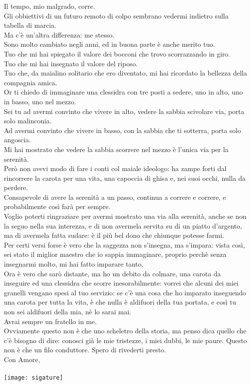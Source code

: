 \documentclass[17pt]{extletter}
\begin{document}
Il tempo, mio malgrado, corre.\\
Gli obbiettivi di un futuro remoto di colpo sembrano vedermi indietro sulla tabella di marcia.\\
Ma c'è un'altra differenza: me stesso.\\
Sono molto cambiato negli anni, ed in buona parte è anche merito tuo.\\
Tuo che mi hai spiegato il valore dei bocconi che trovo scorrazzando in giro.\\
Tuo che mi hai insegnato il valore del riposo.\\
Tuo che, da maialino solitario che ero diventato, mi hai ricordato la bellezza della compagnia amica.\\
Or ti chiedo di immaginare una clessidra con tre posti a sedere, uno in alto, uno in basso, uno nel mezzo.\\
Sei tu ad avermi convinto che vivere in alto, vedere la sabbia scivolare via, porta solo malinconia.\\
Ad avermi convinto che vivere in basso, con la sabbia che ti sotterra, porta solo angoscia.\\
Mi hai mostrato che vedere la sabbia scorrere nel mezzo è l'unica via per la serenità.\\
Però non avevi modo di fare i conti col maiale ideologo: ha zampe forti dal rincorrere la carota per una vita, una capoccia di ghisa e, nei suoi occhi, nulla da perdere.\\
Consapevole di avere la serenità a un passo, continua a correre e correre, e probabilmente così farà per sempre.\\
Voglio poterti ringraziare per avermi mostrato una via alla serenità, anche se non la seguo nella sua interezza, e di non avermela servita su di un piatto d'argento, ma di avermela fatta sudare: è il più bel dono che chiunque potesse farmi.\\
Per certi versi forse è vero che la saggezza non s'insegna, ma s'impara: vista così, sei stato il miglior maestro che io sappia immaginare, proprio perchè senza insegnarmi molto, mi hai fatto imparare tanto.\\
Ora è vero che sarò distante, ma ho un debito da colmare, una carota da inseguire ed una clessidra che scorre inesorabilmente: vorrei che alcuni dei miei granelli vengano spesi al tuo servizio: se c'è una cosa che ho imparato inseguendo una carota per tutta la vita, è che nulla è aldifuori della tua portata, e così tu non sei aldifuori della mia, nè lo sarai mai.\\
Avrai sempre un fratello in me.\\
Ovviamente questo non è che uno scheletro della storia, ma penso dica quello che c'è bisogno di dire: conosci già le mie tristezze, i miei dubbi, le mie paure. Questo non è che un filo conduttore. Spero di rivederti presto.\\
Con Amore, \\\\
\texttt{[image: sigature]}
\end{document}
